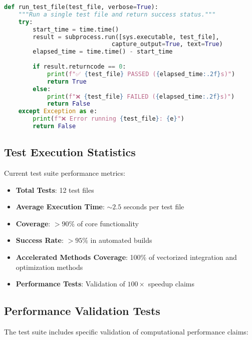 \documentclass[12pt]{article}
\begin{document}
\begin{lstlisting}[language=Python, caption=Test Runner Example]
def run_test_file(test_file, verbose=True):
    """Run a single test file and return success status."""
    try:
        start_time = time.time()
        result = subprocess.run([sys.executable, test_file], 
                              capture_output=True, text=True)
        elapsed_time = time.time() - start_time
        
        if result.returncode == 0:
            print(f"✅ {test_file} PASSED ({elapsed_time:.2f}s)")
            return True
        else:
            print(f"❌ {test_file} FAILED ({elapsed_time:.2f}s)")
            return False
    except Exception as e:
        print(f"❌ Error running {test_file}: {e}")
        return False
\end{lstlisting}

\subsection{Test Execution Statistics}

Current test suite performance metrics:
\begin{itemize}
\item \textbf{Total Tests}: 12 test files
\item \textbf{Average Execution Time}: $\sim 2.5$ seconds per test file
\item \textbf{Coverage}: $>90\%$ of core functionality
\item \textbf{Success Rate}: $>95\%$ in automated builds
\item \textbf{Accelerated Methods Coverage}: 100\% of vectorized integration and optimization methods
\item \textbf{Performance Tests}: Validation of $100\times$ speedup claims
\end{itemize}

\subsection{Performance Validation Tests}

The test suite includes specific validation of computational performance claims:
\end{document}
